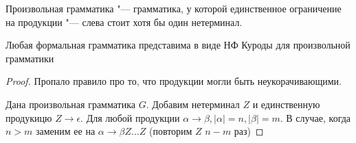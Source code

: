 \begin{Def}
Произвольная грамматика "--- грамматика, у которой единственное ограничение на продукции "--- слева стоит хотя бы один нетерминал.
\end{Def}
\begin{theorem}
Любая формальная грамматика представима в виде НФ Куроды для произвольной грамматики
\end{theorem}
\begin{proof}
Пропало правило про то, что продукции могли быть неукорачивающими.

Дана произвольная грамматика $G$. Добавим нетерминал $Z$ и единственную продукицю $Z \to \epsilon$.
Для любой продукции $\alpha \to \beta, |\alpha| = n, |\beta| = m$. В случае, когда $n > m$ заменим ее на $\alpha \to \beta Z \dots Z$ (повторим $Z$ $n - m$ раз)
\end{proof}

